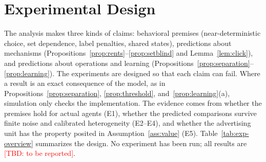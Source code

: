 \documentclass[opre,dblanonrev]{informs4}
\providecommand{\1}{\mathbf{1}}
\providecommand{\TBD}[1]{\textcolor{red}{[TBD: #1]}}
\begin{document}
\section{Experimental Design}\label{sec:experiments}

The analysis makes three kinds of claims: behavioral premises (near-deterministic choice, set dependence, label penalties, shared states), predictions about mechanisms (Propositions~\ref{prop:rents}--\ref{prop:setblind} and Lemma~\ref{lem:click}), and predictions about operations and learning (Propositions~\ref{prop:separation}--\ref{prop:learning}). The experiments are designed so that each claim can fail. Where a result is an exact consequence of the model, as in Propositions~\ref{prop:separation}, \ref{prop:threshold}, and~\ref{prop:learning}(a), simulation only checks the implementation. The evidence comes from whether the premises hold for actual agents (E1), whether the predicted comparisons survive finite noise and calibrated heterogeneity (E2--E4), and whether the advertising unit has the property posited in Assumption~\ref{ass:value} (E5). Table~\ref{tab:exp-overview} summarizes the design. No experiment has been run; all results are \TBD{to be reported}.
\end{document}
